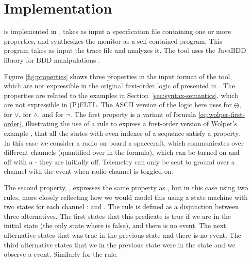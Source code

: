 
\section{Implementation}

\dejavu{} is implemented in \scalalang{}.   
\dejavu{} takes as input a specification file containing one  or 
more  properties, and synthesizes the monitor as a self-contained \scalalang{} 
program.
This program takes as input the 
trace file and analyzes it.
The tool uses the JavaBDD library for BDD manipulations \cite{javabdd}.

\vspace{1ex}
Figure \ref{fig:properties} shows three properties in the 
input format of the tool, which are not expressible in the original first-order logic of \dejavu{} presented in \cite{HPU}. The properties are related to the examples in Section~\ref{sec:syntax-semantics}, which
are not expressible in (P)FLTL.
%
The ASCII version of the logic here uses 
 for $\ominus$,
\idsl{|} for $\vee$,
\idsl{&} for $\wedge$, and
\idsl{!} for $\neg$.
%
The first property  is a variant of
formula \ref{eq:wolper-first-order}, illustrating the use of a 
rule to express a first-order version of Wolper's example \cite{Wolper}, that all the states with even indexes of a sequence satisfy a property.
In this case we consider a radio on board a spacecraft, which communicates over different channels (quantified over in the formula), which can be turned on and off with a  - they are initially off.
Telemetry can only be sent to ground over a channel  with the  event when radio channel  is toggled on.


The second property, , expresses the same 
property as , but in this case using two 
rules, more closely reflecting how we would model this using a state machine with two states for each channel : 
 and . The rule  is defined as a disjunction between three alternatives. The first states that this predicate is true if we are in the initial state 
(the only state where  is false), and there is no  event. The next alternative states that
 was true in the previous state and there is
no  event.
The third alternative states that we in the previous state were
in the  state and we observe a  
event. Similarly for the  rule.

